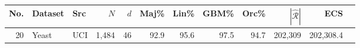 \begin{table}[htbp]
    \centering
    \scriptsize
    \begin{tabular}{rllrrrrrrrrr}
        \toprule
        \textbf{No.} & \textbf{Dataset} & \textbf{Src} & $N$ & $d$ & \textbf{Maj\%} & \textbf{Lin\%} & \textbf{GBM\%} & \textbf{Orc\%} & $|\hat{\mathcal{R}}|$ & \textbf{ECS} \\ 
        \midrule
        20 & Yeast & UCI & 1,484 & 46 & 92.9 & 95.6 & 97.5 & 94.7 & 202,309 & 202,308.4 \\
        \bottomrule
    \end{tabular}
\end{table}
